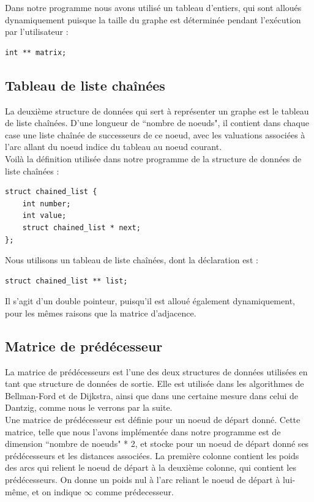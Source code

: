 \documentclass[a4paper,12pt,final] {article}
\begin{document}
Dans notre programme nous avons utilisé un tableau d'entiers, qui sont alloués dynamiquement puisque la taille du graphe est déterminée pendant l'exécution par l'utilisateur :
\begin{lstlisting}
int ** matrix;
\end{lstlisting}

\subsection{Tableau de liste chaînées}

La deuxième structure de données qui sert à représenter un graphe est le tableau de liste chaînées. D'une longueur de ``nombre de noeuds", il contient dans chaque case une liste chaînée de successeurs de ce noeud, avec les valuations associées à l'arc allant du noeud indice du tableau au noeud courant.\\

Voilà la définition utilisée dans notre programme de la structure de données de liste chaînées :
\begin{lstlisting}
struct chained_list {
	int number;
	int value;
	struct chained_list * next;
};
\end{lstlisting}

Nous utilisons un tableau de liste chaînées, dont la déclaration est :
\begin{lstlisting}
struct chained_list ** list;
\end{lstlisting}
Il s'agit d'un double pointeur, puisqu'il est alloué également dynamiquement, pour les mêmes raisons que la matrice d'adjacence.

\subsection{Matrice de prédécesseur}

La matrice de prédécesseurs est l'une des deux structures de données utilisées en tant que structure de données de sortie. Elle est utilisée dans les algorithmes de Bellman-Ford et de Dijkstra, ainsi que dans une certaine mesure dans celui de Dantzig, comme nous le verrons par la suite.\\

Une matrice de prédécesseur est définie pour un noeud de départ donné. Cette matrice, telle que nous l'avons implémentée dans notre programme est de dimension ``nombre de noeuds" * 2, et stocke pour un noeud de départ donné ses prédécesseurs et les distances associées. La première colonne contient les poids des arcs qui relient le noeud de départ à la deuxième colonne, qui contient les prédécesseurs. On donne un poids nul à l'arc reliant le noeud de départ  à lui-même, et on indique $\infty$ comme prédecesseur.\\
\end{document}
